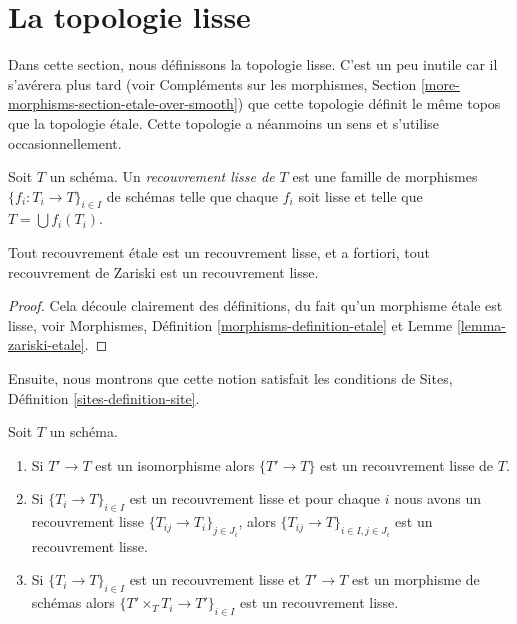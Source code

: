 \section{La topologie lisse}
\label{section-smooth}

\noindent
Dans cette section, nous définissons la topologie lisse. C'est un peu inutile car il s'avérera plus tard (voir Compléments sur les morphismes, Section \ref{more-morphisms-section-etale-over-smooth}) que cette topologie définit le même topos que la topologie étale. Cette topologie a néanmoins un sens et s'utilise occasionnellement.

\begin{definition}
\label{definition-smooth-covering}
Soit $T$ un schéma. Un {\it recouvrement lisse de $T$} est une famille de morphismes $\{f_i : T_i \to T\}_{i \in I}$ de schémas telle que chaque $f_i$ soit lisse et telle que $T = \bigcup f_i(T_i)$.
\end{definition}

\begin{lemma}
\label{lemma-zariski-etale-smooth}
Tout recouvrement étale est un recouvrement lisse, et a fortiori, tout recouvrement de Zariski est un recouvrement lisse.
\end{lemma}

\begin{proof}
Cela découle clairement des définitions, du fait qu'un morphisme étale est lisse, voir Morphismes, Définition \ref{morphisms-definition-etale} et Lemme \ref{lemma-zariski-etale}.
\end{proof}


\noindent
Ensuite, nous montrons que cette notion satisfait les conditions de Sites, Définition \ref{sites-definition-site}.

\begin{lemma}
\label{lemma-smooth}
Soit $T$ un schéma.
\begin{enumerate}
\item Si $T' \to T$ est un isomorphisme alors $\{T' \to T\}$ est un recouvrement lisse de $T$.
\item Si $\{T_i \to T\}_{i\in I}$ est un recouvrement lisse et pour chaque $i$ nous avons un recouvrement lisse $\{T_{ij} \to T_i\}_{j\in J_i}$, alors $\{T_{ij} \to T\}_{i \in I, j\in J_i}$ est un recouvrement lisse.
\item Si $\{T_i \to T\}_{i\in I}$ est un recouvrement lisse et $T' \to T$ est un morphisme de schémas alors $\{T' \times_T T_i \to T'\}_{i\in I}$ est un recouvrement lisse.
\end{enumerate}
\end{lemma}

